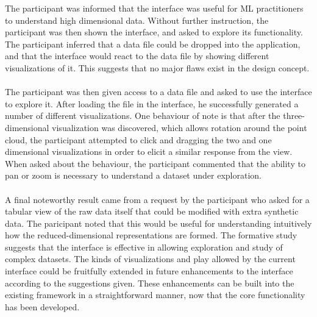 \documentclass{sigchi}
\begin{document}
The participant was informed that the interface was useful for ML practitioners to understand high dimensional data. %
%
Without further instruction, the participant was then shown the interface, and asked to explore its functionality. %
%
The participant inferred that a data file could be dropped into the application, and that the interface would react to the data file by showing different visualizations of it. %
%
This suggests that no major flaws exist in the design concept. %
%
\\\\
%
The participant was then given access to a data file and asked to use the interface to explore it. %
%
After loading the file in the interface, he successfully generated a number of different visualizations. %
%
One behaviour of note is that after the three-dimensional visualization was discovered, which allows rotation around the point cloud, the participant attempted to click and dragging the two and one dimensional visualizations in order to elicit a similar response from the view. %
%
When asked about the behaviour, the participant commented that the ability to pan or zoom is necessary to understand a dataset under exploration. %
%
\\\\
%
A final noteworthy result came from a request by the participant who asked for a tabular view of the raw data itself that could be modified with extra synthetic data. %
%
The paricipant noted that this would be useful for understanding intuitively how the reduced-dimensional representations are formed. %
%
The formative study suggests that the interface is effective in allowing exploration and study of complex datasets. %
%
The kinds of visualizations and play allowed by the current interface could be fruitfully extended in future enhancements to the interface according to the suggestions given. %
%
These enhancements can be built into the existing framework in a straightforward manner, now that the core functionality has been developed. %
%
\end{document}
